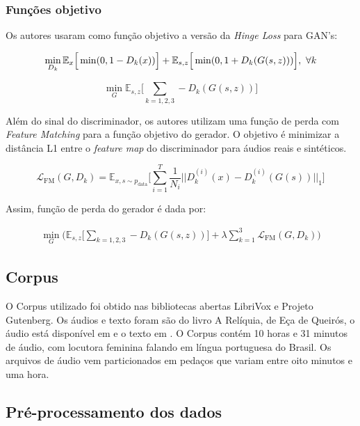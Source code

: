 \documentclass{article}
\begin{document}
\subsubsection{Funções objetivo}

Os autores usaram como função objetivo a versão da \textit{Hinge Loss}\cite{} para GAN's: 

\begin{equation}
\min_{D_k} \mathbb{E}_x \Big[\min(0, 1 - D_k(x))\Big] + \mathbb{E}_{s,z} \Big[\min(0, 1 + D_k(G(s, z)))\Big],\  \forall k\\
\end{equation}

\begin{equation}
\min_G \mathbb{E}_{s,z} \Bigg[\sum_{k=1,2,3}-D_k(G(s, z)) \Bigg]
\end{equation}

Além do sinal do discriminador, os autores utilizam uma função de perda com \textit{Feature Matching}\cite{} para a função objetivo do gerador. O objetivo é minimizar a distância L1 entre o \textit{feature map} do discriminador para áudios reais e sintéticos.

\begin{equation}
\mathcal{L}_{\text{FM}}(G, D_k) = \mathbb{E}_{x, s \sim p_\text{data}} \Bigg[\sum_{i=1}^T \frac{1}{N_i} ||D_k^{(i)}(x) - D_k^{(i)}(G(s))||_1\Bigg]
\end{equation}

Assim, função de perda do gerador é dada por:

\begin{align}
\min_G \Bigg(\mathbb{E}_{s,z} \bigg[\sum_{k=1,2,3} -D_k(G(s, z)) \bigg] + \lambda \sum_{k=1}^3 \mathcal{L}_{\text{FM}}(G, D_k) \Bigg)
\end{align}

\subsection{Corpus}

O Corpus utilizado foi obtido nas bibliotecas abertas LibriVox\cite{librivox} e Projeto Gutenberg\cite{gutenberg}. Os áudios e texto foram são do livro A Relíquia, de Eça de Queirós, o áudio está disponível em \cite{reliquia} e o texto em \cite{reliquia-text}. O Corpus contém 10 horas e 31 minutos de áudio, com locutora feminina falando em língua portuguesa do Brasil. Os arquivos de áudio vem particionados em pedaços que variam entre oito minutos e uma hora.

\subsection{Pré-processamento dos dados}
\end{document}
